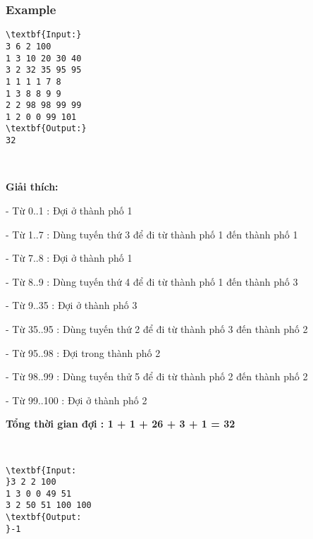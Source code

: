 \subsubsection{Example}
\begin{verbatim}
\textbf{Input:}
3 6 2 100
1 3 10 20 30 40
3 2 32 35 95 95
1 1 1 1 7 8
1 3 8 8 9 9
2 2 98 98 99 99
1 2 0 0 99 101
\textbf{Output:}
32\end{verbatim}

 

\textbf{Giải thích:}


- Từ 0..1 : Đợi ở thành phố 1


- Từ 1..7 : Dùng tuyến thứ 3 để đi từ thành phố 1 đến thành phố 1


- Từ 7..8 : Đợi ở thành phố 1


- Từ 8..9 : Dùng tuyến thứ 4 để đi từ thành phố 1 đến thành phố 3


- Từ 9..35 : Đợi ở thành phố 3


- Từ 35..95 : Dùng tuyến thứ 2 để đi từ thành phố 3 đến thành phố 2


- Từ 95..98 : Đợi trong thành phố 2


- Từ 98..99 : Dùng tuyến thử 5 để đi từ thành phố 2 đến thành phố 2


- Từ 99..100 : Đợi ở thành phố 2


\textbf{Tổng thời gian đợi : 1 + 1 + 26 + 3 + 1 = 32}

 
\begin{verbatim}
\textbf{Input:
}3 2 2 100
1 3 0 0 49 51
3 2 50 51 100 100
\textbf{Output:
}-1
\end{verbatim}

 

